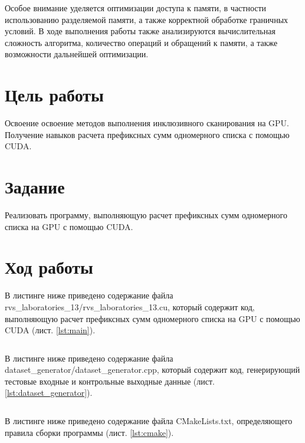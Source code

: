 \documentclass[14pt]{extarticle}
\makeatletter
\newenvironment{code}{\captionsetup{type=listing, belowskip=-14pt plus 3pt minus 0pt}}{}
\newcommand{\numbersections}{\renewcommand{\Hy@numberline}[1]{##1~}}
\let\oldsection\section
\renewcommand{\section}{\numbersections\oldsection}
\makeatother
\begin{document}
Особое внимание уделяется оптимизации доступа к памяти, в частности использованию разделяемой памяти, а также корректной обработке граничных условий. В ходе выполнения работы также анализируются вычислительная сложность алгоритма, количество операций и обращений к памяти, а также возможности дальнейшей оптимизации.

\section{Цель работы}

Освоение освоение методов выполнения инклюзивного сканирования на GPU. Получение навыков расчета префиксных сумм одномерного списка с помощью CUDA.

\section{Задание}

Реализовать программу, выполняющую расчет префиксных сумм одномерного списка на GPU с помощью CUDA.

\section{Ход работы}

В листинге ниже приведено содержание файла rvs\_laboratories\_13/\-rvs\_lab\-orat\-ories\_13.cu, который содержит код, выполняющую расчет префиксных сумм одномерного списка на GPU с помощью CUDA (лист. \ref{lst:main}).

\begin{code}    
	\caption{Содержание rvs\_laboratories\_13/rvs\_laboratories\_13.cu\label{lst:main}}
	\inputminted{c++}{../rvs_laboratories_13/rvs_laboratories_13.cu}
\end{code}

В листинге ниже приведено содержание файла dataset\_generator/data\-set\-\_gen\-er\-at\-or.cpp, который содержит код, генерирующий тестовые входные и контрольные выходные данные (лист. \ref{lst:dataset_generator}).

\begin{code}    
	\caption{Содержание dataset\_generator/dataset\_generator.cpp\label{lst:dataset_generator}}
	\inputminted{c++}{../dataset_generator/dataset_generator.cpp}
\end{code}

В листинге ниже приведено содержание файла CMakeLists.txt, определяющего правила сборки программы (лист. \ref{lst:cmake}).
\end{document}
